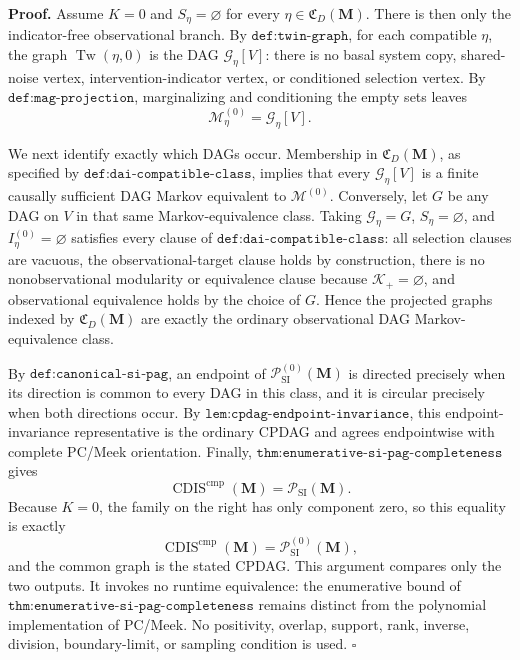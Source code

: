 \textbf{Proof.}
Assume \(K=0\) and \(S_\eta=\varnothing\) for every \(\eta\in\mathfrak C_D(\mathbf M)\).  There is then only the indicator-free observational branch.  By \(\texttt{def:twin-graph}\), for each compatible \(\eta\), the graph \(\operatorname{Tw}(\eta,0)\) is the DAG \(\mathcal G_\eta[V]\): there is no basal system copy, shared-noise vertex, intervention-indicator vertex, or conditioned selection vertex.  By \(\texttt{def:mag-projection}\), marginalizing and conditioning the empty sets leaves
\[
\mathcal M_\eta^{(0)}=\mathcal G_\eta[V].
\]

We next identify exactly which DAGs occur.  Membership in \(\mathfrak C_D(\mathbf M)\), as specified by \(\texttt{def:dai-compatible-class}\), implies that every \(\mathcal G_\eta[V]\) is a finite causally sufficient DAG Markov equivalent to \(\mathcal M^{(0)}\).  Conversely, let \(G\) be any DAG on \(V\) in that same Markov-equivalence class.  Taking \(\mathcal G_\eta=G\), \(S_\eta=\varnothing\), and \(I_\eta^{(0)}=\varnothing\) satisfies every clause of \(\texttt{def:dai-compatible-class}\): all selection clauses are vacuous, the observational-target clause holds by construction, there is no nonobservational modularity or equivalence clause because \(\mathcal K_+=\varnothing\), and observational equivalence holds by the choice of \(G\).  Hence the projected graphs indexed by \(\mathfrak C_D(\mathbf M)\) are exactly the ordinary observational DAG Markov-equivalence class.

By \(\texttt{def:canonical-si-pag}\), an endpoint of \(\mathcal P_{\mathrm{SI}}^{(0)}(\mathbf M)\) is directed precisely when its direction is common to every DAG in this class, and it is circular precisely when both directions occur.  By \(\texttt{lem:cpdag-endpoint-invariance}\), this endpoint-invariance representative is the ordinary CPDAG and agrees endpointwise with complete PC/Meek orientation.  Finally, \(\texttt{thm:enumerative-si-pag-completeness}\) gives
\[
\operatorname{CDIS}^{\mathrm{cmp}}(\mathbf M)
=\mathcal P_{\mathrm{SI}}(\mathbf M).
\]
Because \(K=0\), the family on the right has only component zero, so this equality is exactly
\[
\operatorname{CDIS}^{\mathrm{cmp}}(\mathbf M)
=\mathcal P_{\mathrm{SI}}^{(0)}(\mathbf M),
\]
and the common graph is the stated CPDAG.  This argument compares only the two outputs.  It invokes no runtime equivalence: the enumerative bound of \(\texttt{thm:enumerative-si-pag-completeness}\) remains distinct from the polynomial implementation of PC/Meek.  No positivity, overlap, support, rank, inverse, division, boundary-limit, or sampling condition is used. \(\square\)